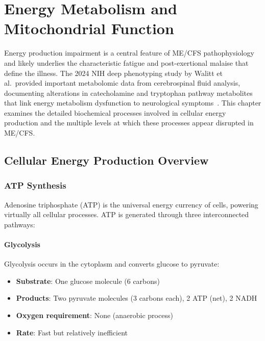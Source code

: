 \chapter{Energy Metabolism and Mitochondrial Function}
\label{ch:energy-metabolism}

Energy production impairment is a central feature of ME/CFS pathophysiology and likely underlies the characteristic fatigue and post-exertional malaise that define the illness. The 2024 NIH deep phenotyping study by Walitt et al.\ provided important metabolomic data from cerebrospinal fluid analysis, documenting alterations in catecholamine and tryptophan pathway metabolites that link energy metabolism dysfunction to neurological symptoms~\cite{walitt2024deep}. This chapter examines the detailed biochemical processes involved in cellular energy production and the multiple levels at which these processes appear disrupted in ME/CFS.

\section{Cellular Energy Production Overview}
\label{sec:energy-overview}

\subsection{ATP Synthesis}
\label{sec:atp-synthesis}

Adenosine triphosphate (ATP) is the universal energy currency of cells, powering virtually all cellular processes. ATP is generated through three interconnected pathways:

\subsubsection{Glycolysis}

Glycolysis occurs in the cytoplasm and converts glucose to pyruvate:

\begin{itemize}
    \item \textbf{Substrate}: One glucose molecule (6 carbons)
    \item \textbf{Products}: Two pyruvate molecules (3 carbons each), 2 ATP (net), 2 NADH
    \item \textbf{Oxygen requirement}: None (anaerobic process)
    \item \textbf{Rate}: Fast but relatively inefficient
\end{itemize}

